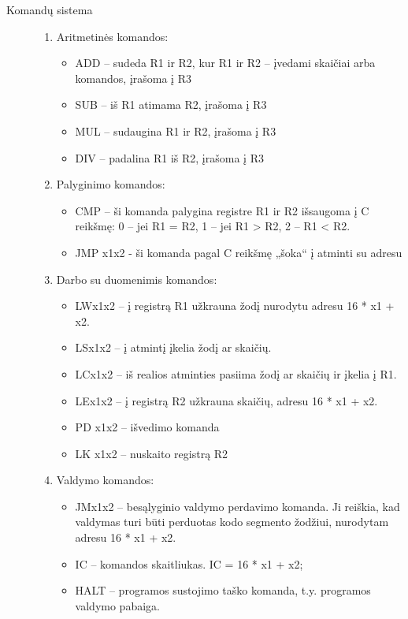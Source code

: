\begin{description}
\item[Komandų sistema] \leavevmode 
\begin{enumerate}
\item Aritmetinės komandos: \leavevmode 
\begin{itemize}
\item ADD – sudeda R1 ir R2, kur R1 ir R2 – įvedami skaičiai arba komandos, įrašoma į R3
\item SUB – iš R1 atimama R2, įrašoma į R3
\item MUL – sudaugina R1 ir R2, įrašoma į R3
\item DIV – padalina R1 iš R2, įrašoma į R3
\end{itemize}
\item Palyginimo komandos:
\begin{itemize}
\item CMP – ši komanda palygina registre R1 ir R2 išsaugoma į C reikšmę: 0 – jei R1 = R2,  1 – jei R1 > R2, 2 –  R1 < R2.
\item JMP x1x2 - ši komanda pagal C reikšmę „šoka“ į atminti su adresu 
\end{itemize}
\item  Darbo su duomenimis komandos:
\begin{itemize}
\item LWx1x2 – į registrą R1 užkrauna žodį nurodytu adresu 16 * x1 + x2.
\item LSx1x2 – į atmintį įkelia žodį ar skaičių.
\item LCx1x2 – iš realios atminties pasiima žodį ar skaičių ir įkelia į R1.
\item LEx1x2 – į registrą R2 užkrauna skaičių, adresu 16 * x1 + x2.
\item PD x1x2 – išvedimo komanda
\item LK x1x2 – nuskaito registrą R2
\end{itemize}
\item Valdymo komandos:
\begin{itemize}
\item JMx1x2 – besąlyginio valdymo perdavimo komanda. Ji reiškia, kad valdymas turi būti perduotas kodo segmento žodžiui, nurodytam adresu 16 * x1 + x2.
\item IC – komandos skaitliukas. IC = 16 * x1 + x2;
\item HALT – programos sustojimo taško komanda, t.y. programos valdymo pabaiga.
\end{itemize}
\end{enumerate}
\end{description}   
   
